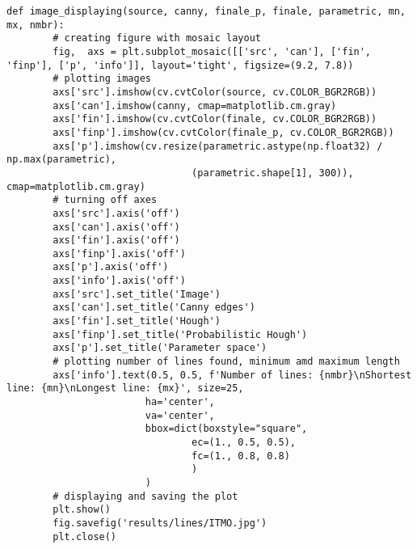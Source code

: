     \begin{lstlisting}[caption={Исходный код функции для создания сравнительного изображения с результатами преобразования}, label={lst:show_images}]
    def image_displaying(source, canny, finale_p, finale, parametric, mn, mx, nmbr):
        # creating figure with mosaic layout
        fig,  axs = plt.subplot_mosaic([['src', 'can'], ['fin', 'finp'], ['p', 'info']], layout='tight', figsize=(9.2, 7.8))
        # plotting images
        axs['src'].imshow(cv.cvtColor(source, cv.COLOR_BGR2RGB))
        axs['can'].imshow(canny, cmap=matplotlib.cm.gray)
        axs['fin'].imshow(cv.cvtColor(finale, cv.COLOR_BGR2RGB))
        axs['finp'].imshow(cv.cvtColor(finale_p, cv.COLOR_BGR2RGB))
        axs['p'].imshow(cv.resize(parametric.astype(np.float32) / np.max(parametric),
                                (parametric.shape[1], 300)), cmap=matplotlib.cm.gray)
        # turning off axes
        axs['src'].axis('off')
        axs['can'].axis('off')
        axs['fin'].axis('off')
        axs['finp'].axis('off')
        axs['p'].axis('off')
        axs['info'].axis('off')
        axs['src'].set_title('Image')
        axs['can'].set_title('Canny edges')
        axs['fin'].set_title('Hough')
        axs['finp'].set_title('Probabilistic Hough')
        axs['p'].set_title('Parameter space')
        # plotting number of lines found, minimum amd maximum length
        axs['info'].text(0.5, 0.5, f'Number of lines: {nmbr}\nShortest line: {mn}\nLongest line: {mx}', size=25,
                        ha='center',
                        va='center',
                        bbox=dict(boxstyle="square",
                                ec=(1., 0.5, 0.5),
                                fc=(1., 0.8, 0.8)
                                )
                        )
        # displaying and saving the plot
        plt.show()
        fig.savefig('results/lines/ITMO.jpg')
        plt.close()
        \end{lstlisting}
